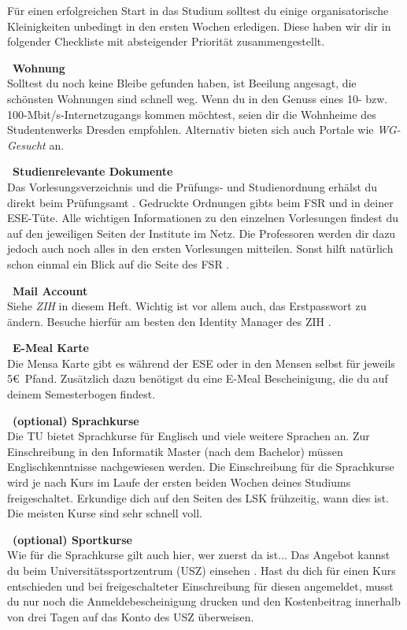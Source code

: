 \newcommand{\checkbox}[1]{\raisebox{-.15em}{\Square}\ \textbf{#1} \\}


Für einen erfolgreichen Start in das Studium solltest du einige organisatorische Kleinigkeiten unbedingt in den ersten Wochen erledigen.
Diese haben wir dir in folgender Checkliste mit absteigender Priorität zusammengestellt.

\checkbox{Wohnung}
Solltest du noch keine Bleibe gefunden haben, ist Beeilung angesagt, die schönsten Wohnungen sind schnell weg.
Wenn du in den Genuss eines 10- bzw. 100-Mbit/s-Internetzugangs kommen möchtest, seien dir die Wohnheime  des Studentenwerks Dresden empfohlen. Alternativ bieten sich auch Portale wie \textit{WG-Gesucht}  an.

\checkbox{Studienrelevante Dokumente}
Das Vorlesungsverzeichnis und die Prüfungs- und Studienordnung erhälst du direkt beim Prüfungsamt .
Gedruckte Ordnungen gibts beim FSR und in deiner ESE-Tüte.
Alle wichtigen Informationen zu den einzelnen Vorlesungen findest du auf den jeweiligen Seiten der Institute im Netz.
Die Professoren werden dir dazu jedoch auch noch alles in den ersten Vorlesungen mitteilen. Sonst hilft natürlich schon einmal ein Blick auf die Seite des FSR .

\checkbox{Mail Account}
Siehe \textit{ZIH} in diesem Heft. Wichtig ist vor allem auch, das Erstpasswort zu ändern. Besuche hierfür am besten den Identity Manager des ZIH .

\checkbox{E-Meal Karte}
Die Mensa Karte gibt es während der ESE oder in den Mensen selbst für jeweils 5\euro\ Pfand.
Zusätzlich dazu benötigst du eine E-Meal Bescheinigung, die du auf deinem Semesterbogen findest.

\checkbox{(optional) Sprachkurse}
Die TU bietet Sprachkurse für Englisch und viele weitere Sprachen an. Zur Einschreibung in den Informatik Master (nach dem Bachelor) müssen Englischkenntnisse nachgewiesen werden. Die Einschreibung für die Sprachkurse wird je nach Kurs im Laufe der ersten beiden Wochen deines Studiums freigeschaltet.
Erkundige dich auf den Seiten des LSK  frühzeitig, wann dies ist. Die meisten Kurse sind sehr schnell voll.

\checkbox{(optional) Sportkurse}
Wie für die Sprachkurse gilt auch hier, wer zuerst da ist...
Das Angebot kannst du beim Universitätssportzentrum (USZ) einsehen .
Hast du dich für einen Kurs entschieden und bei freigeschalteter Einschreibung für diesen angemeldet, musst du nur noch die Anmeldebescheinigung drucken und den Kostenbeitrag innerhalb von drei Tagen auf das Konto des USZ überweisen.

